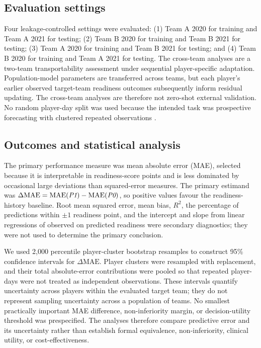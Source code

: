 \subsection{Evaluation settings}
Four leakage-controlled settings were evaluated: (1) Team A 2020 for training and Team A 2021 for testing; (2) Team B 2020 for training and Team B 2021 for testing; (3) Team A 2020 for training and Team B 2021 for testing; and (4) Team B 2020 for training and Team A 2021 for testing. The cross-team analyses are a two-team transportability assessment under sequential player-specific adaptation. Population-model parameters are transferred across teams, but each player's earlier observed target-team readiness outcomes subsequently inform residual updating. The cross-team analyses are therefore not zero-shot external validation. No random player-day split was used because the intended task was prospective forecasting with clustered repeated observations \citep{Bergmeir2018,Roberts2017,Debray2023TRIPODCluster}.

\subsection{Outcomes and statistical analysis}
The primary performance measure was mean absolute error (MAE), selected because it is interpretable in readiness-score points and is less dominated by occasional large deviations than squared-error measures. The primary estimand was $\Delta\mathrm{MAE}=\mathrm{MAE}(\textit{P1})-\mathrm{MAE}(\textit{P0})$, so positive values favour the readiness-history baseline. Root mean squared error, mean bias, $R^2$, the percentage of predictions within $\pm1$ readiness point, and the intercept and slope from linear regressions of observed on predicted readiness were secondary diagnostics; they were not used to determine the primary conclusion.

We used 2,000 percentile player-cluster bootstrap resamples to construct 95\% confidence intervals for $\Delta\mathrm{MAE}$. Player clusters were resampled with replacement, and their total absolute-error contributions were pooled so that repeated player-days were not treated as independent observations. These intervals quantify uncertainty across players within the evaluated target team; they do not represent sampling uncertainty across a population of teams. No smallest practically important MAE difference, non-inferiority margin, or decision-utility threshold was prespecified. The analyses therefore compare predictive error and its uncertainty rather than establish formal equivalence, non-inferiority, clinical utility, or cost-effectiveness.

